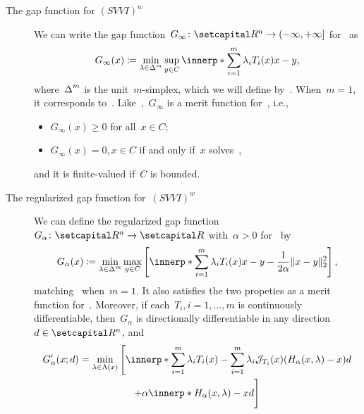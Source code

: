 \documentclass[../../main]{subfiles}
\begin{document}
\begin{example} 
    \begin{description}
        \item[The gap function for $(SVVI)^w$~\cite{Charitha2010,Li2010}]
            We can write the gap function~$G_\infty \colon \setR^n \to (-\infty, +\infty]$ for~ as
            \begin{equation}
                G_\infty(x) \coloneqq \min_{\lambda \in \simplex^m} \sup_{y \in C} \innerp*{\sum_{i = 1}^{m} \lambda_i T_i(x)}{x - y}
            ,\end{equation} 
            where~$\operatorname{\Delta}^m$ is the unit~$m$-simplex, which we will define by~.
            When~$m = 1$, it corresponds to~.
            Like~,~$G_\infty$ is a merit function for~, i.e.,
            \begin{itemize}
                \item $G_\infty(x) \ge 0$ for all~$x \in C$;
                \item $G_\infty(x) = 0, x \in C$ if and only if~$x$ solves~,
            \end{itemize}
            and it is finite-valued if~$C$ is bounded.
        \item[The regularized gap function for~$(SVVI)^w$~\cite{Charitha2010}]
            We can define the regularized gap function~$G_\alpha \colon \setR^n \to \setR$ with~$\alpha > 0$ for~ by
            \begin{equation} \label{eq:reg_gap_SVVIw}
                G_\alpha(x) \coloneqq \min_{\lambda \in \simplex^m} \max_{y \in C} \left[ \innerp*{\sum_{i = 1}^{m} \lambda_i T_i(x)}{x - y} - \frac{1}{2 \alpha} \norm{x - y}_2^2 \right] 
            ,\end{equation} 
            matching~ when~$m = 1$.
            It also satisfies the two propeties as a merit function for~.
            Moreover, if each~$T_i, i = 1, \dots, m$ is continuously differentiable, then~$G_\alpha$ is directionally differentiable in any direction~$d \in \setR^n$, and
            \begin{multline}
                G_\alpha'(x;d) = \min_{\lambda \in \Lambda(x)} \Bigg[ \innerp*{\sum_{i = 1}^{m} \lambda_i T_i(x) - \sum_{i = 1}^{m} \lambda_i \jdv{T_i}{x} (H_\alpha(x, \lambda) - x)}{d} \\
                + \alpha \innerp*{H_\alpha(x, \lambda) - x}{d} \Bigg] 

\end{multline}
\end{description}
\end{example}
\end{document}
